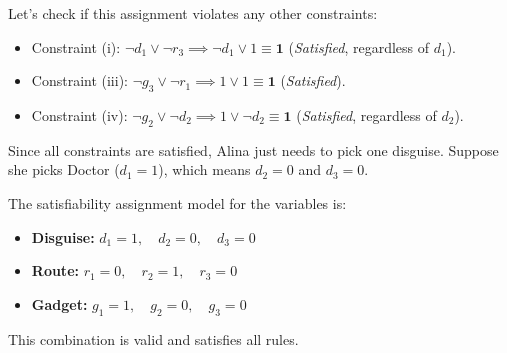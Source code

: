 \documentclass[a4paper]{article}
\theoremstyle{definition}
\begin{document}
\begin{enumerate}
\begin{enumerate}
                Let's check if this assignment violates any other constraints:
                \begin{itemize}
                  \item Constraint (i): $\neg d_1 \lor \neg r_3 \implies \neg d_1 \lor 1 \equiv \mathbf{1}$ (\textit{Satisfied}, regardless of $d_1$).
                  \item Constraint (iii): $\neg g_3 \lor \neg r_1 \implies 1 \lor 1 \equiv \mathbf{1}$ (\textit{Satisfied}).
                  \item Constraint (iv): $\neg g_2 \lor \neg d_2 \implies 1 \lor \neg d_2 \equiv \mathbf{1}$ (\textit{Satisfied}, regardless of $d_2$).
                \end{itemize}

                Since all constraints are satisfied, Alina just needs to pick one disguise. Suppose she picks Doctor ($d_1 = 1$), which means $d_2 = 0$ and $d_3 = 0$.

                The satisfiability assignment model for the variables is:
                \begin{itemize}
                  \item \textbf{Disguise:} $d_1 = 1,\quad d_2 = 0,\quad d_3 = 0$
                  \item \textbf{Route:} $r_1 = 0,\quad r_2 = 1,\quad r_3 = 0$
                  \item \textbf{Gadget:} $g_1 = 1,\quad g_2 = 0,\quad g_3 = 0$
                \end{itemize}
                This combination is valid and satisfies all rules.
        \end{enumerate}
\end{enumerate}
\end{document}
